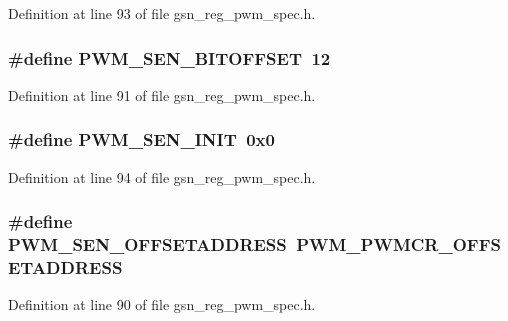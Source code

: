 Definition at line 93 of file gsn\_\-reg\_\-pwm\_\-spec.h.

\hypertarget{a00565_a04ad96c43a0a475b6b58512e3a2751f1}{
\subsubsection[{PWM\_\-SEN\_\-BITOFFSET}]{\setlength{\rightskip}{0pt plus 5cm}\#define PWM\_\-SEN\_\-BITOFFSET~12}}
\label{a00565_a04ad96c43a0a475b6b58512e3a2751f1}


Definition at line 91 of file gsn\_\-reg\_\-pwm\_\-spec.h.

\hypertarget{a00565_a6320df8f16adebd9db7d8814d6eec919}{
\subsubsection[{PWM\_\-SEN\_\-INIT}]{\setlength{\rightskip}{0pt plus 5cm}\#define PWM\_\-SEN\_\-INIT~0x0}}
\label{a00565_a6320df8f16adebd9db7d8814d6eec919}


Definition at line 94 of file gsn\_\-reg\_\-pwm\_\-spec.h.

\hypertarget{a00565_a1b7f936a7649c7f0768376f5b1708791}{
\subsubsection[{PWM\_\-SEN\_\-OFFSETADDRESS}]{\setlength{\rightskip}{0pt plus 5cm}\#define PWM\_\-SEN\_\-OFFSETADDRESS~PWM\_\-PWMCR\_\-OFFSETADDRESS}}
\label{a00565_a1b7f936a7649c7f0768376f5b1708791}


Definition at line 90 of file gsn\_\-reg\_\-pwm\_\-spec.h.

